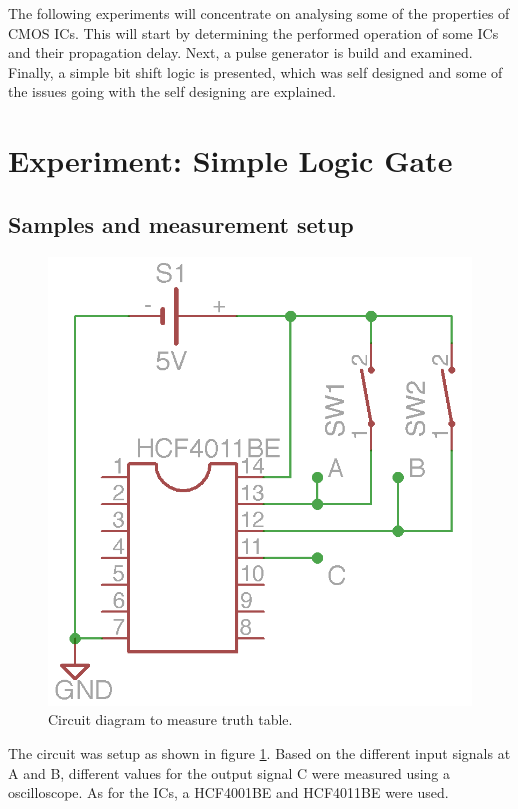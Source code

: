 \documentclass[journal]{IEEEtran}
\begin{document}
The following experiments will concentrate on analysing some of the properties
of CMOS ICs. This will start by determining the performed operation of some ICs
and their propagation delay. Next, a pulse generator is build and examined.
Finally, a simple bit shift logic is presented, which was self designed and some
of the issues going with the self designing are explained.

\section{Experiment: Simple Logic Gate}

\subsection{Samples and measurement setup}

\begin{figure}[h!]
  \centering
   \includegraphics[]{boards/truth.png}
   \caption{Circuit diagram to measure truth table.}
   \label{fig:truth_circuit}
\end{figure}

The circuit was setup as shown in figure \ref{fig:truth_circuit}. Based on the
different input signals at A and B, different values for the output signal C
were measured using a oscilloscope. As for the ICs, a HCF4001BE and HCF4011BE
were used.
\end{document}
